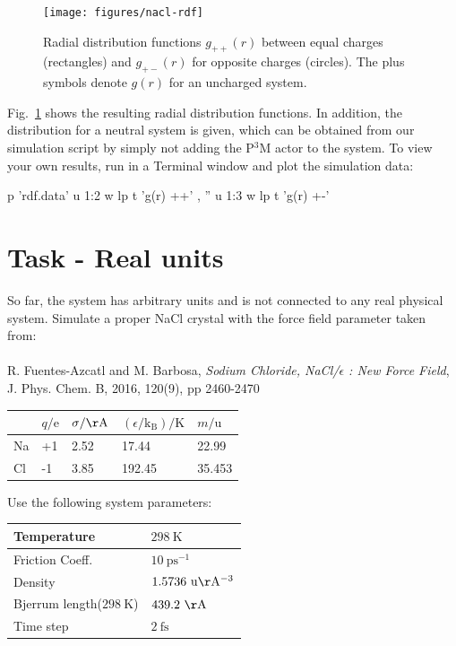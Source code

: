 \documentclass[
a4paper,                        %
11pt,                           %
twoside,                        %
footsepline,                    %
headsepline,                    %
headexclude,                    %
footexclude,                    %
pagesize,                       %
]{scrartcl}
\begin{document}
\begin{figure}[tb]
  \centering
  \texttt{[image: figures/nacl-rdf]}
  \caption{Radial distribution functions $g_{++}(r)$ between equal
    charges (rectangles) and $g_{+-}(r)$ for opposite charges
    (circles). The plus symbols denote $g(r)$ for an uncharged
    system.}
  \label{fig:rdf}
\end{figure}

Fig.~\ref{fig:rdf} shows the resulting radial distribution functions. In
addition, the distribution for a neutral system is given, which can be obtained
from our simulation script by simply not adding the P$^3$M actor to the system.
To view your own results, run  in a Terminal window
and plot the simulation data:

\begin{pypresso}
p 'rdf.data' u 1:2 w lp t 'g(r) ++' , '' u 1:3 w lp t 'g(r) +-'
\end{pypresso}

\section{Task - Real units}

So far, the system has arbitrary units and is not connected to any real physical system.
Simulate a proper NaCl crystal with the force field parameter taken from:\\
\\
\noindent R. Fuentes-Azcatl and M. Barbosa, \emph{Sodium Chloride, NaCl/$\epsilon$ : New Force Field},\\ J. Phys. Chem. B, 2016, 120(9), pp 2460-2470
\begin{table}[h]
    \centering
    \begin{tabular}{l|llll}
           & $q/\mathrm{e}$  & $\sigma / \mathrm{\AA} $ & $(\epsilon /\mathrm{k_B})/\mathrm{K}$ & $m/\mathrm{u}$  \\
        \hline
        Na & +1     & 2.52          & 17.44                 & 22.99  \\
        \hline
        Cl & -1     & 3.85          & 192.45                & 35.453 
    \end{tabular}
\end{table}

Use the following system parameters:

\begin{table}[h]
    \centering
    \begin{tabular}{l|l}
        Temperature            & $298 \ \mathrm{K}$          \\
        \hline
        Friction Coeff.        & $10 \ \mathrm{ps^{-1}}$      \\
        \hline
        Density                & $1.5736 \ \mathrm{u \AA^{-3}}$ \\
        \hline
        Bjerrum length($298 \ \mathrm{K}$) & $439.2 \ \mathrm{\AA}$      \\
        \hline
        Time step              & $2 \ \mathrm{fs}$
    \end{tabular}
\end{table}
\end{document}
